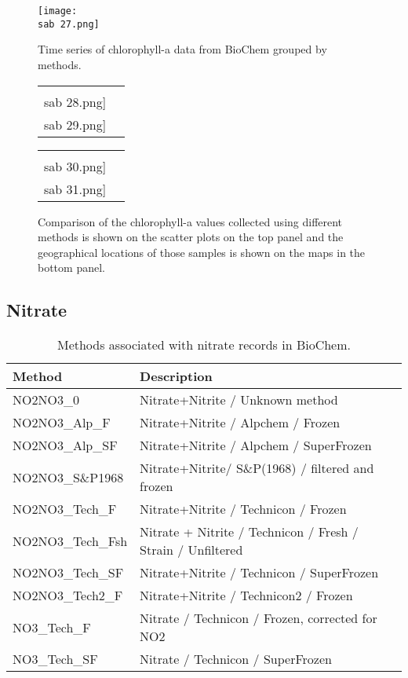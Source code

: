\documentclass[letterpaper,portrait,11pt]{scrartcl}
\numberwithin{equation}{section}		%
\numberwithin{figure}{section}			%
\numberwithin{table}{section}				%
\newcommand{\ecomod}{\string~/ecomod_data/}   %
\newcommand{\sab}{\ecomod/mpa/sab/}   %
\begin{document}
\begin{appendices}
\begin{figure}[h]
  \label{fig:ChlaTimeseries}
  \centering
  \texttt{[image: \\sab 27.png]}
  \caption{Time series of chlorophyll-a data from BioChem grouped by methods.}
\end{figure}


\begin{figure}[h]
  \label{fig:ChlaComparison}
  \centering
  \begin{tabular}{cc}
    \texttt{[image: \\sab 28.png]}
    \texttt{[image: \\sab 29.png]} 
  \end{tabular}
  \begin{tabular}{cc}
    \texttt{[image: \\sab 30.png]}
    \texttt{[image: \\sab 31.png]}
  \end{tabular}
  \caption{Comparison of the chlorophyll-a values collected using different methods is shown on the scatter plots on the top panel and the geographical locations of those samples is shown on the maps in the bottom panel.}
\end{figure}



\clearpage

\subsection{Nitrate}

% 
\begin{table}[h]
  \label{table:Nmethods}
  \caption{Methods associated with nitrate records in BioChem.}
  \begin{tabular}{ll}
    Method & Description\\
    \hline
    NO2NO3\_0 & Nitrate+Nitrite / Unknown method \\
    NO2NO3\_Alp\_F & Nitrate+Nitrite / Alpchem / Frozen \\
    NO2NO3\_Alp\_SF & Nitrate+Nitrite / Alpchem / SuperFrozen \\
    NO2NO3\_S\&P1968 & Nitrate+Nitrite/ S\&P(1968) / filtered and frozen \\
    NO2NO3\_Tech\_F & Nitrate+Nitrite / Technicon / Frozen \\
    NO2NO3\_Tech\_Fsh & Nitrate + Nitrite / Technicon / Fresh / Strain / Unfiltered \\
    NO2NO3\_Tech\_SF & Nitrate+Nitrite / Technicon / SuperFrozen \\
    NO2NO3\_Tech2\_F & Nitrate+Nitrite / Technicon2 / Frozen \\
    NO3\_Tech\_F & Nitrate / Technicon / Frozen, corrected for NO2 \\
    NO3\_Tech\_SF & Nitrate / Technicon / SuperFrozen\\
  \end{tabular}
\end{table}


\end{appendices}
\end{document}
